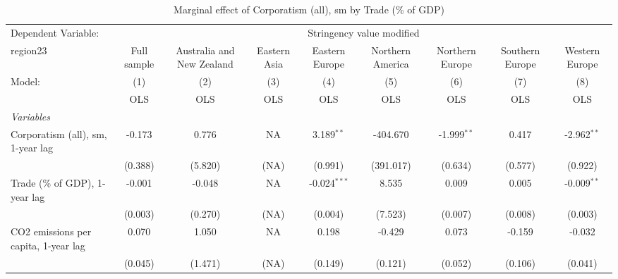 
\begin{table}[htbp]
   \caption{Marginal effect of Corporatism (all), sm by Trade (\% of GDP)}
   \centering
   \begin{tabular}{lcccccccc}
      \toprule
      Dependent Variable: & \multicolumn{8}{c}{Stringency value modified}\\
      region23                                                           & Full sample   & Australia and New Zealand & Eastern Asia & Eastern Europe & Northern America & Northern Europe & Southern Europe & Western Europe \\   
      Model:                                                             & (1)           & (2)                       & (3)          & (4)            & (5)              & (6)             & (7)             & (8)\\  
                                                                         &  OLS          & OLS                       & OLS          & OLS            & OLS              & OLS             & OLS             & OLS\\  
      \midrule
      \emph{Variables}\\
      Corporatism (all), sm, 1-year lag                                  & -0.173        & 0.776                     & NA           & 3.189$^{**}$   & -404.670         & -1.999$^{**}$   & 0.417           & -2.962$^{**}$\\   
                                                                         & (0.388)       & (5.820)                   & (NA)         & (0.991)        & (391.017)        & (0.634)         & (0.577)         & (0.922)\\   
      Trade (\% of GDP), 1-year lag                                      & -0.001        & -0.048                    & NA           & -0.024$^{***}$ & 8.535            & 0.009           & 0.005           & -0.009$^{**}$\\   
                                                                         & (0.003)       & (0.270)                   & (NA)         & (0.004)        & (7.523)          & (0.007)         & (0.008)         & (0.003)\\   
      CO2 emissions per capita, 1-year lag                               & 0.070         & 1.050                     & NA           & 0.198          & -0.429           & 0.073           & -0.159          & -0.032\\   
                                                                         & (0.045)       & (1.471)                   & (NA)         & (0.149)        & (0.121)          & (0.052)         & (0.106)         & (0.041)\\   

\end{tabular}
\end{table}

